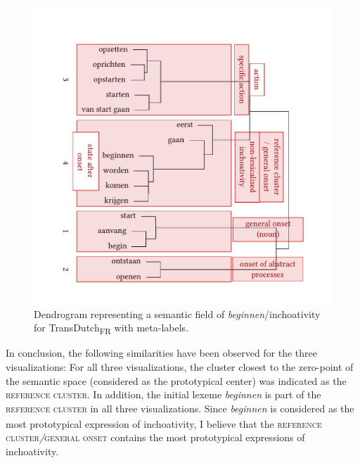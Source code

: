\begin{figure}
\includegraphics[width=\textwidth]{figures/tree86.pdf}
\caption{\label{fig:4:83}Dendrogram representing a semantic field of \textit{beginnen}/inchoativity for TransDutch\textsubscript{FR} with meta-labels.}
\end{figure}

In conclusion, the following similarities have been observed for the three visualizations: For all three visualizations, the cluster closest to the zero-point of the semantic space (considered as the prototypical center) was indicated as the \textsc{reference cluster}. In addition, the initial lexeme \textit{beginnen} is part of the \textsc{reference cluster} in all three visualizations.\textsubscript{} Since \textit{beginnen} is considered as the most prototypical expression of inchoativity, I believe that the \textsc{reference cluster}\textit{/}\textsc{general onset} contains the most prototypical expressions of inchoativity. 

